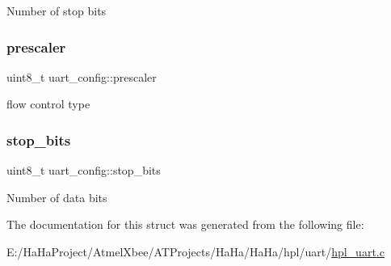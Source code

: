 Number of stop bits \mbox{\label{structuart__config_a9fb83c1cf1226b2dc4371bb79699dd71}} 
\subsubsection{\texorpdfstring{prescaler}{prescaler}}
{\footnotesize\ttfamily uint8\+\_\+t uart\+\_\+config\+::prescaler}

flow control type \mbox{\label{structuart__config_a7b98cd63c531110dc3dc99e94db73642}} 
\subsubsection{\texorpdfstring{stop\+\_\+bits}{stop\_bits}}
{\footnotesize\ttfamily uint8\+\_\+t uart\+\_\+config\+::stop\+\_\+bits}

Number of data bits 

The documentation for this struct was generated from the following file\+:\begin{DoxyCompactItemize}
\item 
E\+:/\+Ha\+Ha\+Project/\+Atmel\+Xbee/\+A\+T\+Projects/\+Ha\+Ha/\+Ha\+Ha/hpl/uart/\hyperlink{hpl__uart_8c}{hpl\+\_\+uart.\+c}\end{DoxyCompactItemize}
